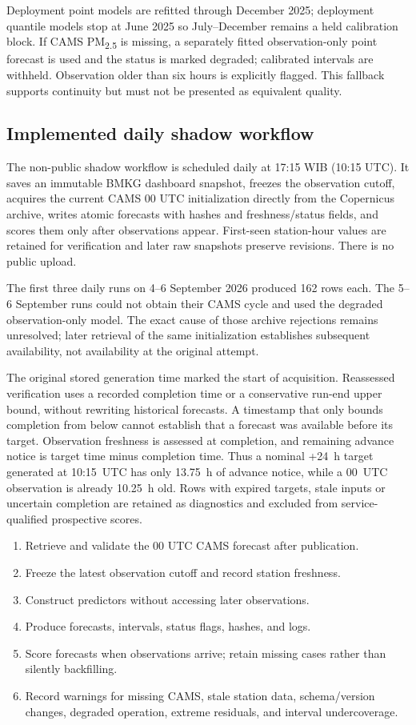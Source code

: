 \documentclass[11pt,a4paper]{article}
\begin{document}
Deployment point models are refitted through December 2025; deployment quantile models stop at June 2025 so July--December remains a held calibration block. If CAMS PM\textsubscript{2.5} is missing, a separately fitted observation-only point forecast is used and the status is marked degraded; calibrated intervals are withheld. Observation older than six hours is explicitly flagged. This fallback supports continuity but must not be presented as equivalent quality.

\subsection{Implemented daily shadow workflow}
The non-public shadow workflow is scheduled daily at 17:15 WIB (10:15 UTC). It saves an immutable BMKG dashboard snapshot, freezes the observation cutoff, acquires the current CAMS 00 UTC initialization directly from the Copernicus archive, writes atomic forecasts with hashes and freshness/status fields, and scores them only after observations appear. First-seen station-hour values are retained for verification and later raw snapshots preserve revisions. There is no public upload.

The first three daily runs on 4--6 September 2026 produced 162 rows each. The 5--6 September runs could not obtain their CAMS cycle and used the degraded observation-only model. The exact cause of those archive rejections remains unresolved; later retrieval of the same initialization establishes subsequent availability, not availability at the original attempt.

The original stored generation time marked the start of acquisition. Reassessed verification uses a recorded completion time or a conservative run-end upper bound, without rewriting historical forecasts. A timestamp that only bounds completion from below cannot establish that a forecast was available before its target. Observation freshness is assessed at completion, and remaining advance notice is target time minus completion time. Thus a nominal +24~h target generated at 10:15~UTC has only 13.75~h of advance notice, while a 00~UTC observation is already 10.25~h old. Rows with expired targets, stale inputs or uncertain completion are retained as diagnostics and excluded from service-qualified prospective scores.

\begin{enumerate}
\item Retrieve and validate the 00 UTC CAMS forecast after publication.
\item Freeze the latest observation cutoff and record station freshness.
\item Construct predictors without accessing later observations.
\item Produce forecasts, intervals, status flags, hashes, and logs.
\item Score forecasts when observations arrive; retain missing cases rather than silently backfilling.
\item Record warnings for missing CAMS, stale station data, schema/version changes, degraded operation, extreme residuals, and interval undercoverage.
\end{enumerate}
\end{document}
